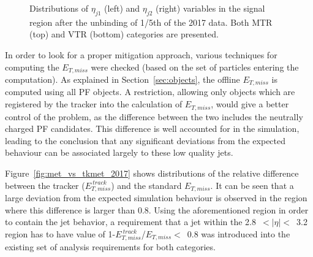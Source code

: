 \begin{figure}[htbp]
{    }
  \caption{Distributions of $\eta_{j1}$ (left) and $\eta_{j2}$ (right) variables in the signal region after the unbinding of 1/5th of the 2017 data. Both MTR (top) and VTR (bottom) categories are presented.}
  \label{fig:jet_eta_preHornCut}
\end{figure}




\hspace{10pt} In order to look for a proper mitigation approach, various techniques for computing the $E_{T, miss}$ were checked (based on the set of particles entering the computation). As explained in Section~\ref{sec:objects}, the offline $E_{T,miss}$ is computed using all PF objects. A restriction, allowing only objects which are registered by the tracker into the calculation of $E_{T,miss}$, would give a better control of the problem, as the difference between the two includes the neutrally charged PF candidates. This difference is well accounted for in the simulation, leading to the conclusion that any significant deviations from the expected behaviour can be associated largely to these low quality jets.

\hspace{10pt} Figure~\ref{fig:met_vs_tkmet_2017} shows distributions of the relative difference between the tracker ($E_{T,miss}^{~track}$) and the standard $E_{T, miss}$. It can be seen that a large deviation from the expected simulation behaviour is observed in the region where this difference is larger than 0.8. Using the aforementioned region in order to contain the jet behavior, a requirement that a jet within the 2.8~$<|\eta|<$~3.2 region has to have value of 1-$E_{T,miss}^{~track}$/$E_{T, miss}<$~0.8  was introduced into the existing set of analysis requirements for both categories.


